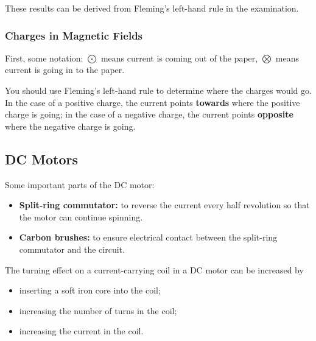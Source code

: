 \documentclass[../main.tex]{subfiles}
\begin{document}
	These results can be derived from Fleming's left-hand rule in the examination.
	
	\subsubsection{Charges in Magnetic Fields}
	First, some notation: \(\bigodot\) means current is coming out of the paper, \(\bigotimes\) means current is going in to the paper.
	
	You should use Fleming's left-hand rule to determine where the charges would go. In the case of a positive charge, the current points \textbf{towards} where the positive charge is going; in the case of a negative charge, the current points \textbf{opposite} where the negative charge is going.
	
	\subsection{DC Motors}
	Some important parts of the DC motor:
	\begin{itemize}
		\item \textbf{Split-ring commutator:} to reverse the current every half revolution so that the motor can continue spinning.
		\item \textbf{Carbon brushes:} to ensure electrical contact between the split-ring commutator and the circuit.
	\end{itemize}

	The turning effect on a current-carrying coil in a DC motor can be increased by
	\begin{itemize}
		\item inserting a soft iron core into the coil;
		\item increasing the number of turns in the coil;
		\item increasing the current in the coil.
	\end{itemize}
\end{document}
